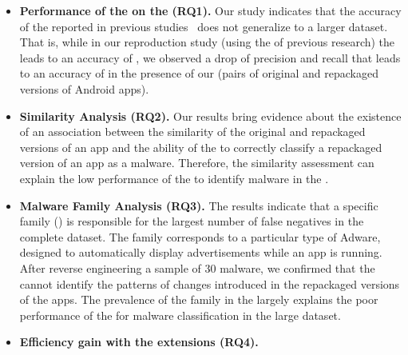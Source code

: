 \begin{itemize}
\item \textbf{Performance of the \mas on the \cds (RQ1).} 
  Our study indicates that the accuracy of the \mas reported in
  previous studies~\cite{DBLP:conf/wcre/BaoLL18,DBLP:journals/jss/CostaMMSSBNR22} does not
  generalize to a larger dataset. That is, while in our
  reproduction study (using the \sds of previous research) the \mas
  leads to an accuracy of \fscoreSmall, we observed a drop of precision and recall
  that leads to an accuracy of \fscore in the presence of our \cds (\apps pairs of
  original and repackaged versions of Android apps). 


\item \textbf{Similarity Analysis (RQ2).} Our results bring evidence about the existence of an association between the similarity of the original and repackaged versions of an app and the ability of the \mas to correctly classify a repackaged version of an app as a malware. Therefore, the similarity assessment can explain the low performance of the \mas to identify malware in the \cds.

\item \textbf{Malware Family Analysis (RQ3).} The results indicate that a specific family
  (\gps)  is responsible for the largest number of false
  negatives in the complete dataset. The \gps family corresponds to a particular type of
  Adware, designed to automatically display advertisements while an app is running. After reverse engineering
  a sample of 30 \gps malware, we confirmed that the \mas cannot identify the
  patterns of changes introduced in the repackaged versions of the apps. The prevalence of the \gps family
  in the \cds largely explains the poor performance of the \mas for malware classification in the large dataset. 

\item \textbf{Efficiency gain with the \mas extensions (RQ4).}

\end{itemize}



